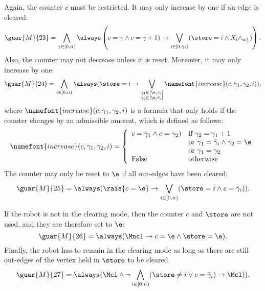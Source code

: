 Again, the counter $c$ must be restricted. It may only increase by one if an edge is cleared:
\begin{equation*}
	\guar{M}{23} = \bigwedge_{\gamma \in [0, \bar{\alpha})}\always\left(c=\gamma \wedge \next(c=\gamma+1) \rightarrow \bigvee_{i \in [0, \bar{\gamma}_i)}(\store=i \wedge X_i \wedge \next X_{w_\gamma^i})\right).
\end{equation*}
Also, the counter may not decrease unless it is reset. Moreover, it may only increase by one:
\begin{equation*}
	\guar{M}{24} = \bigwedge_{i \in [0, n)}\always(\store=i \rightarrow \bigvee_{\substack{\gamma_1 \in [\e, \bar{\gamma}_i] \\ \gamma_2 \in [\e, \bar{\gamma}_i]}}\namefont{increase}(c, \gamma_1, \gamma_2, i)),
\end{equation*}
where $\namefont{increase}(c, \gamma_1, \gamma_2, i)$ is a formula that only holds if the counter changes by an admissible amount, which is defined as follows:
\begin{equation*}
	\namefont{increase}(c, \gamma_1, \gamma_2, i) =
	\left\{
	\begin{array}{ll}
		c=\gamma_1 \wedge \next(c=\gamma_2) & \mbox{if } \gamma_2=\gamma_1+1 \\&\mbox{or } \gamma_1=\bar{\gamma}_i \wedge \gamma_2=\e \\&\mbox{or } \gamma_1=\gamma_2 \\
		\mathrm{False} & \mbox{otherwise}
	\end{array}
	\right.
\end{equation*}
The counter may only be reset to $\e$ if all out-edges have been cleared:
\begin{equation*}
	\guar{M}{25} = \always(\rais{c=\e} \rightarrow \bigvee_{i \in [0, n)}(\store=i \wedge c=\bar{\gamma}_i)).
\end{equation*}

If the robot is not in the clearing mode, then the counter $c$ and $\store$ are not used, and they are therefore set to $\e$:
\begin{equation*}
	\guar{M}{26} = \always(\Mncl \rightarrow c=\e \wedge \store=\e).
\end{equation*}
Finally, the robot has to remain in the clearing mode as long as there are still out-edges of the vertex held in $\store$ to be cleared.
\begin{equation*}
	\guar{M}{27} = \always(\Mcl \wedge \neg\bigwedge_{i \in [0, n)}(\store\neq i \vee c=\bar{\gamma}_i) \rightarrow \next(\Mcl)).
\end{equation*}


